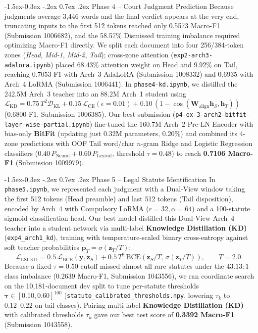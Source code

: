 \documentclass[11pt, oneside]{article}
\makeatletter
\renewcommand\subsection{\@startsection{subsection}{2}{\z@}%
  {-1.5ex\@plus -0.3ex \@minus -.2ex}%
  {0.7ex \@plus .2ex}%
  {\normalfont\large\bfseries}}
\makeatother
\begin{document}
\subsection{Phase 4 -- Court Judgment Prediction}
Because judgments average 3,446 words and the final verdict appears at the very end, truncating inputs to the first 512 tokens reached only 0.5573 Macro-F1 (Submission 1006682), and the 58.57\% Dismissed training imbalance required optimizing Macro-F1 directly. We split each document into four 256/384-token zones (\emph{Head}, \emph{Mid-1}, \emph{Mid-2}, \emph{Tail}); cross-zone attention (\texttt{exp2-arch3-adalora.ipynb}) placed 68.43\% attention weight on Head and 9.92\% on Tail, reaching 0.7053 F1 with Arch~3 AdaLoRA (Submission 1008332) and 0.6935 with Arch~4 LoRMA (Submission 1006441). In \texttt{phase4-kd.ipynb}, we distilled the 242.5M Arch~3 teacher into an 88.2M Arch~1 student using $\mathcal{L}_{\mathrm{KD}} = 0.75\, T^2 \mathcal{D}_{\mathrm{KL}} + 0.15\,\mathcal{L}_{\mathrm{CE}}(\epsilon=0.01) + 0.10\,(1 - \cos(\mathbf{W}_{\mathrm{align}}\mathbf{h}_S, \mathbf{h}_T))$ (0.6800 F1, Submission 1006385). Our best submission (\texttt{p4-ex-3-arch2-bitfit-layer-wise-partial.ipynb}) fine-tuned the 160.7M Arch~2 Pre-LN Encoder with bias-only \textbf{BitFit} (updating just 0.32M parameters, 0.20\%) and combined its 4-zone predictions with OOF Tail word/char $n$-gram Ridge and Logistic Regression classifiers ($0.40\,P_{\mathrm{Neural}} + 0.60\,P_{\mathrm{Lexical}}$, threshold $\tau=0.48$) to reach \textbf{0.7106 Macro-F1} (Submission 1009979).

\subsection{Phase 5 -- Legal Statute Identification}
In \texttt{phase5.ipynb}, we represented each judgment with a Dual-View window taking the first 512 tokens (Head preamble) and last 512 tokens (Tail disposition), encoded by Arch~4 with Compulsory LoRMA ($r=32, \alpha=64$) and a 100-statute sigmoid classification head. Our best model distilled this Dual-View Arch~4 teacher into a student network via multi-label \textbf{Knowledge Distillation (KD)} (\texttt{exp4\_arch1\_kd}), training with temperature-scaled binary cross-entropy against soft teacher probabilities $\mathbf{p}_T = \sigma(\mathbf{z}_T/T)$:
\begin{equation}
\mathcal{L}_{\mathrm{LSI\text{-}KD}} = 0.5\,\mathcal{L}_{\mathrm{BCE}}(\mathbf{y}, \mathbf{z}_S) + 0.5\,T^2\,\mathrm{BCE}\!\left(\mathbf{z}_S/T,\, \sigma(\mathbf{z}_T/T)\right), \qquad T=2.0.
\end{equation}
Because a fixed $\tau=0.50$ cutoff missed almost all rare statutes under the $43.13:1$ class imbalance (0.2639 Macro-F1, Submission 1043556), we ran coordinate search on the 10,181-document dev split to tune per-statute thresholds $\boldsymbol{\tau} \in [0.10, 0.60]^{100}$ (\texttt{statute\_calibrated\_thresholds.npy}, lowering $\tau_k$ to $0.12\text{--}0.22$ on tail classes). Pairing multi-label \textbf{Knowledge Distillation (KD)} with calibrated thresholds $\tau_k$ gave our best test score of \textbf{0.3392 Macro-F1} (Submission 1043558).
\end{document}

